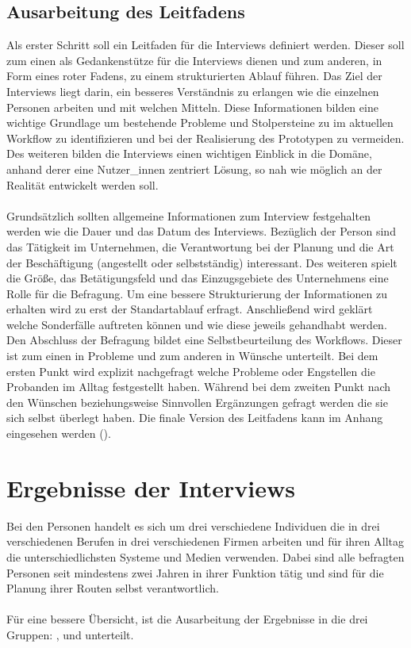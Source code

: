 \documentclass[Bachelorarbeit.tex]{subfiles}
\begin{document}
\subsection{Ausarbeitung des Leitfadens}

Als erster Schritt soll ein Leitfaden für die Interviews definiert werden. 
Dieser soll zum einen als Gedankenstütze für die Interviews dienen und zum anderen, in Form eines roter Fadens, zu einem strukturierten Ablauf führen.
Das Ziel der Interviews liegt darin, ein besseres Verständnis zu erlangen wie die einzelnen Personen arbeiten und mit welchen Mitteln.
Diese Informationen bilden eine wichtige Grundlage um bestehende Probleme und Stolpersteine zu im aktuellen Workflow zu identifizieren und bei der Realisierung des Prototypen zu vermeiden. 
Des weiteren bilden die Interviews einen wichtigen Einblick in die Domäne, anhand derer eine Nutzer\_innen zentriert Lösung, so nah wie möglich an der Realität entwickelt werden soll.\\
\\
Grundsätzlich sollten allgemeine Informationen zum Interview festgehalten werden wie die Dauer und das Datum des Interviews.
Bezüglich der Person sind das Tätigkeit im Unternehmen, die Verantwortung bei der Planung und die Art der Beschäftigung (angestellt oder selbstständig) interessant.
Des weiteren spielt die Größe, das Betätigungsfeld und das Einzugsgebiete des Unternehmens eine Rolle für die Befragung.
Um eine bessere Strukturierung der Informationen zu erhalten wird zu erst der Standartablauf erfragt. 
Anschließend wird geklärt welche Sonderfälle auftreten können und wie diese jeweils gehandhabt werden.
Den Abschluss der Befragung bildet eine Selbstbeurteilung des Workflows. 
Dieser ist zum einen in Probleme und zum anderen in Wünsche unterteilt.
Bei dem ersten Punkt wird explizit nachgefragt welche Probleme oder Engstellen die Probanden im Alltag festgestellt haben.
Während bei dem zweiten Punkt nach den Wünschen beziehungsweise Sinnvollen Ergänzungen gefragt werden die sie sich selbst überlegt haben. 
Die finale Version des Leitfadens kann im Anhang eingesehen werden (). 







\section{Ergebnisse der Interviews}
Bei den Personen handelt es sich um drei verschiedene Individuen die in drei verschiedenen Berufen in drei verschiedenen Firmen arbeiten und für ihren Alltag die unterschiedlichsten Systeme und Medien verwenden. 
Dabei sind alle befragten Personen seit mindestens zwei Jahren in ihrer Funktion tätig und sind für die Planung ihrer Routen selbst verantwortlich.
\\
\\
Für eine bessere Übersicht, ist die Ausarbeitung der Ergebnisse in die drei Gruppen:
,  und  unterteilt. 
\end{document}
